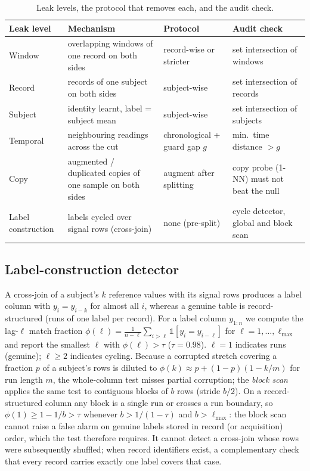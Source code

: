 \documentclass[journal]{IEEEtran}
\begin{document}
\begin{table}[t]
  \caption{Leak levels, the protocol that removes each, and the audit check.}
  \label{tab:taxonomy}
  \centering
  \scriptsize
  \setlength{\tabcolsep}{2.5pt}
  \begin{tabular}{@{}p{1.6cm}p{2.5cm}p{1.7cm}p{2.3cm}@{}}
    \toprule
    \textbf{Leak level} & \textbf{Mechanism} & \textbf{Protocol} & \textbf{Audit check} \\
    \midrule
    Window & overlapping windows of one record on both sides & record-wise or stricter & set intersection of windows \\
    Record & records of one subject on both sides & subject-wise & set intersection of records \\
    Subject & identity learnt, label = subject mean & subject-wise & set intersection of subjects \\
    Temporal & neighbouring readings across the cut & chronological + guard gap $g$ & min.\ time distance $>g$ \\
    Copy & augmented / duplicated copies of one sample on both sides & augment after splitting & copy probe (1-NN) must not beat the null \\
    Label construction & labels cycled over signal rows (cross-join) & none (pre-split) & cycle detector, global and block scan \\
    \bottomrule
  \end{tabular}
\end{table}

\subsection{Label-construction detector}
\label{sec:detector}
A cross-join of a subject's $k$ reference values with its signal rows produces
a label column with $y_i=y_{i-k}$ for almost all $i$, whereas a genuine table
is record-structured (runs of one label per record).  For a label column
$y_{1:n}$ we compute the lag-$\ell$ match fraction
$\phi(\ell)=\frac{1}{n-\ell}\sum_{i>\ell}\mathbb{1}[y_i=y_{i-\ell}]$ for
$\ell=1,\dots,\ell_{\max}$ and report the smallest $\ell$ with
$\phi(\ell)>\tau$ ($\tau=0.98$).  $\ell=1$ indicates runs (genuine); $\ell\ge2$
indicates cycling.  Because a corrupted stretch covering a fraction $p$ of a
subject's rows is diluted to $\phi(k)\approx p+(1-p)(1-k/m)$ for run length
$m$, the whole-column test misses partial corruption; the \emph{block scan}
applies the same test to contiguous blocks of $b$ rows (stride $b/2$).  On a
record-structured column any block is a single run or crosses a run boundary,
so $\phi(1)\ge1-1/b>\tau$ whenever $b>1/(1-\tau)$ and $b>\ell_{\max}$: the
block scan cannot raise a false alarm on genuine labels stored in record (or
acquisition) order, which the test therefore requires.  It cannot detect a
cross-join whose rows were subsequently shuffled; when record identifiers
exist, a complementary check that every record carries exactly one label
covers that case.
\end{document}
